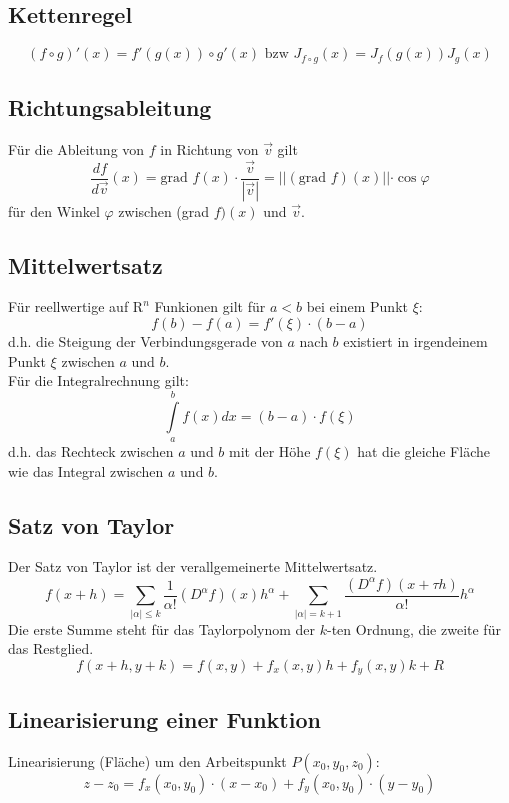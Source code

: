 \documentclass[12pt,a4paper]{article}
\begin{document}
\subsection{Kettenregel}
\[(f \circ g)'(x) = f'(g(x)) \circ g'(x) \text{ bzw } J_{f \circ g}(x) = J_f(g(x)) J_g(x)\]

\subsection{Richtungsableitung}
Für die Ableitung von $f$ in Richtung von $\vec{v}$ gilt
\[\frac{df}{d\vec{v}}(x) = \text{grad }f(x) \cdot \frac{\vec{v}}{\left|\vec{v}\right|} = \left|| (\text{grad } f)(x)\right|| \cdot \cos \varphi \]
für den Winkel $\varphi$ zwischen (grad $f)(x)$ und $\vec{v}$.

\subsection{Mittelwertsatz}
Für reellwertige auf $\mathrm{R}^n$ Funkionen gilt für $a<b$ bei einem Punkt $\xi$:
\[f(b) -f(a) = f'(\xi)\cdot (b-a)\]
d.h. die Steigung der Verbindungsgerade von $a$ nach $b$ existiert in irgendeinem Punkt $\xi$ zwischen $a$ und $b$.\\
Für die Integralrechnung gilt:
\[\int\limits_{a}^{b}{f(x)dx} = (b-a) \cdot f(\xi)\]
d.h. das Rechteck zwischen $a$ und $b$ mit der Höhe $f(\xi)$ hat die gleiche Fläche wie das Integral zwischen $a$ und $b$.\\

\subsection{Satz von Taylor}
Der Satz von Taylor ist der verallgemeinerte Mittelwertsatz.
\[f(x+h) = \sum\limits_{\left| \alpha \right| \leq k}{\frac{1}{\alpha !}(D^\alpha f)(x)h^\alpha} + \sum\limits_{\left| \alpha \right| = k+1}{\frac{(D^\alpha f)(x+\tau h)}{\alpha !} h^\alpha}\]
Die erste Summe steht für das Taylorpolynom der $k$-ten Ordnung, die zweite für das Restglied.
\[f(x+h, y+k) = f(x,y) + f_x(x,y)h + f_y(x,y)k + R\]

\subsection{Linearisierung einer Funktion}
Linearisierung (Fläche) um den Arbeitspunkt $P(x_0,y_0,z_0)$:
\[z-z_0 = f_x(x_0,y_0) \cdot (x-x_0) + f_y(x_0,y_0) \cdot (y-y_0)\]
\end{document}
